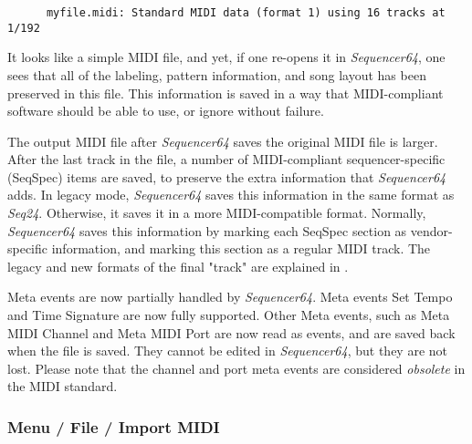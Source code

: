    \begin{verbatim}
      myfile.midi: Standard MIDI data (format 1) using 16 tracks at 1/192
   \end{verbatim}

   It looks like a simple MIDI file, and yet, if one re-opens it in
   \textsl{Sequencer64}, one sees that all of the labeling, pattern
   information, and song layout has been preserved in this file.
   This information is saved in a way that MIDI-compliant software
   should be able to use, or ignore without failure.

   The output MIDI file after \textsl{Sequencer64} saves the original MIDI file
   is larger.
   After the last track in the file, a number of
   MIDI-compliant sequencer-specific (SeqSpec) items are saved, to preserve
   the extra information that \textsl{Sequencer64} adds.
   In legacy mode, \textsl{Sequencer64} saves this information
   in the same format as \textsl{Seq24}.
   Otherwise, it saves it in a more MIDI-compatible format.
   Normally, \textsl{Sequencer64} saves this information by marking
   each SeqSpec section as vendor-specific information, and marking this
   section as a regular MIDI track.
   The legacy and new formats of the final "track" are explained in
   .

   Meta events are now partially handled by \textsl{Sequencer64}.
   Meta events Set Tempo
   and Time Signature
   are now fully supported.
   Other Meta events,
   such as Meta MIDI Channel
   and Meta MIDI Port
   are now read as events, and are saved back when the file is saved.
   They cannot be edited in \textsl{Sequencer64}, but they are
   not lost.
   Please note that the channel and port meta events are
   considered \textsl{obsolete} in the MIDI standard.

\subsubsection{Menu / File / Import MIDI}
\label{subsubsec:seq64_menu_file_import}

